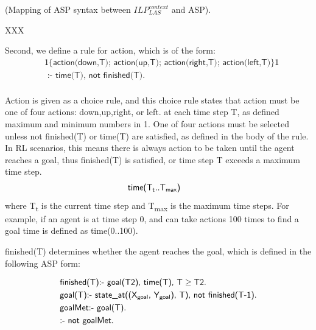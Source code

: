 \begin{examp} \normalfont (Mapping of ASP syntax between $ILP_{LAS}^{context}$ and ASP).

XXX
\end{examp}

Second, we define a rule for action, which is of the form:
\begin{equation}\label{eq:choice_rule}
\begin{split}
&\textsf{1\{action(down,T); action(up,T); action(right,T); action(left,T)\}1} \\
&\textsf{ :- time(T), not finished(T).}\\
\end{split}
\end{equation}

Action is given as a choice rule, and this choice rule states that action must be one of four actions: \textsf{down},\textsf{up},\textsf{right}, or \textsf{left}.
at each time step T, as defined maximum and minimum numbers in 1.
One of four actions must be selected unless \textsf{not finished(T)} or \textsf{time(T)} are satisfied, as defined in the body of the rule.
In RL scenarios, this means there is always action to be taken until the agent reaches a goal, thus \textsf{finished(T)} is satisfied, or time step T exceeds a maximum time step.
\begin{equation}
\begin{split}
&\textsf{time(T\textsubscript{t}..T\textsubscript{max})}
\end{split}
\end{equation}
where T\textsubscript{t} is the current time step and T\textsubscript{max} is the maximum time steps.
For example, if an agent is at time step 0, and can take actions 100 times to find a goal time is defined as \textsf{time(0..100)}.

\textsf{finished(T)} determines whether the agent reaches the goal, which is defined in the following ASP form:

\begin{equation}\label{eq:asp_goal}
\begin{split}
&\textsf{finished(T):- goal(T2), time(T), T} \geq \textsf{T2.}\\
&\textsf{goal(T):- state\_at((X\textsubscript{goal}, Y\textsubscript{goal}), T), not finished(T-1).}\\
&\textsf{goalMet:- goal(T).}\\
&\textsf{:- not goalMet.}
\end{split}
\end{equation}

